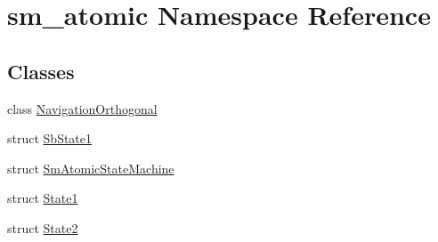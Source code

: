 \hypertarget{namespacesm__atomic}{}\section{sm\+\_\+atomic Namespace Reference}
\label{namespacesm__atomic}
\subsection*{Classes}
\begin{DoxyCompactItemize}
\item 
class \hyperlink{classsm__atomic_1_1NavigationOrthogonal}{Navigation\+Orthogonal}
\item 
struct \hyperlink{structsm__atomic_1_1SbState1}{Sb\+State1}
\item 
struct \hyperlink{structsm__atomic_1_1SmAtomicStateMachine}{Sm\+Atomic\+State\+Machine}
\item 
struct \hyperlink{structsm__atomic_1_1State1}{State1}
\item 
struct \hyperlink{structsm__atomic_1_1State2}{State2}
\end{DoxyCompactItemize}
